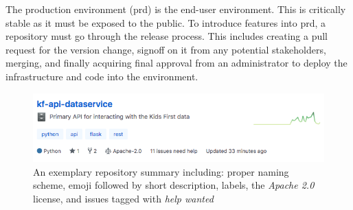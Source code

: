 \documentclass[a4paper,12pt,titlepage]{scrartcl}
\begin{document}
	The production environment (prd) is the end-user environment.
	This is critically stable as it must be exposed to the public.
	To introduce features into prd, a repository must go through the release process.
	This includes creating a pull request for the version change, signoff on it from any potential stakeholders, merging, and finally acquiring final approval from an administrator to deploy the infrastructure and code into the environment.
	
	\begin{figure}
    		\centering
    		\includegraphics[width=0.6\linewidth]{images/reposummary.png}
    		\caption{An exemplary repository summary including: proper naming scheme, emoji followed by short description, labels, the {\em Apache 2.0} license, and issues tagged with {\em help wanted}}
    		\label{fig:reposummary}
    \end{figure}

	
	 
\end{document}
